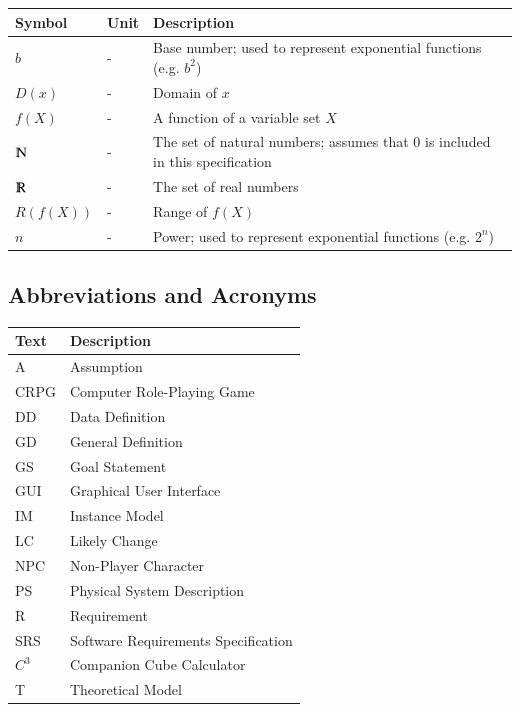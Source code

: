 \documentclass[12pt]{article}
\newcommand{\progname}{Companion Cube Calculator} %
\newcommand{\prognameAbbrv}{$C^{3}$}
\begin{document}
\renewcommand{\arraystretch}{1.2}
\noindent \begin{longtable*}{m{1.5cm} m{1cm} m{12cm}} \toprule
\textbf{Symbol} & \textbf{Unit} & \textbf{Description}\\
\midrule 
$b$ & - & Base number; used to represent exponential functions (e.g. $b^2$)\\
$D(x)$ & - & Domain of $x$\\
$f(X)$ & - & A function of a variable set $X$\\
$\varmathbb{N}$ & - & The set of natural numbers; assumes that $0$ is included 
in this specification\\
$\varmathbb{R}$ & - & The set of real numbers\\
$R(f(X))$ & - & Range of $f(X)$\\
$n$ & - & Power; used to represent exponential functions (e.g. $2^n$) \\
\bottomrule
\end{longtable*}

\subsection{Abbreviations and Acronyms}

\renewcommand{\arraystretch}{1.2}
\begin{tabular}{l l} 
  \toprule		
  \textbf{Text} & \textbf{Description}\\
  \midrule 
  A & Assumption\\
  CRPG & Computer Role-Playing Game\\
  DD & Data Definition\\
  GD & General Definition\\
  GS & Goal Statement\\
  GUI & Graphical User Interface\\
  IM & Instance Model\\
  LC & Likely Change\\
  NPC & Non-Player Character\\
  PS & Physical System Description\\
  R & Requirement\\
  SRS & Software Requirements Specification\\
  \prognameAbbrv{} & \progname{}\\
  T & Theoretical Model\\
  \bottomrule
\end{tabular}
\end{document}

